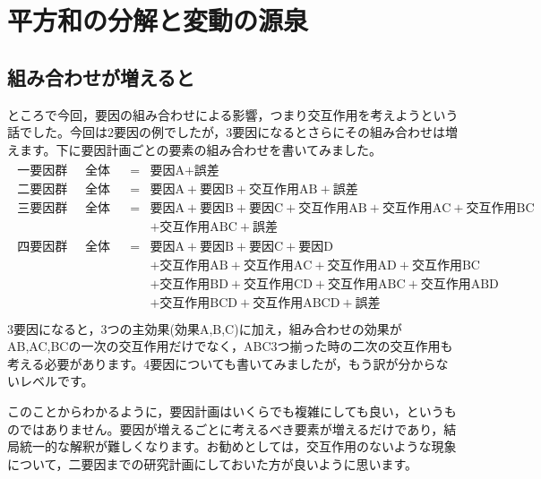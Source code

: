 \documentclass{ltjbook}
\begin{document}
\section{平方和の分解と変動の源泉}
\label{sec:18_3_source_of_variation}
\subsection{組み合わせが増えると}
ところで今回，要因の組み合わせによる影響，つまり交互作用を考えようという話でした。今回は2要因の例でしたが，3要因になるとさらにその組み合わせは増えます。下に要因計画ごとの要素の組み合わせを書いてみました。
\begin{align}
	\begin{array}{llll}
		\mbox{一要因群間計画} & \mbox{全体変動} & = & \mbox{要因A} + \mbox{誤差}                                                          \\
		\mbox{二要因群間計画} & \mbox{全体変動} & = & \mbox{要因A} + \mbox{要因B} +\mbox{交互作用AB} +\mbox{誤差}                               \\
		\mbox{三要因群間計画} & \mbox{全体変動} & = & \mbox{要因A} + \mbox{要因B} + \mbox{要因C}+\mbox{交互作用AB} +\mbox{交互作用AC}+\mbox{交互作用BC} \\
		               &             &   & +\mbox{交互作用ABC}  +\mbox{誤差}                                                     \\
		\mbox{四要因群間計画} & \mbox{全体変動} & = & \mbox{要因A} + \mbox{要因B} + \mbox{要因C} + \mbox{要因D}                               \\
		               &             &   & + \mbox{交互作用AB} +\mbox{交互作用AC} +\mbox{交互作用AD}+\mbox{交互作用BC}                     \\
		               &             &   & +\mbox{交互作用BD} +\mbox{交互作用CD}+\mbox{交互作用ABC}+\mbox{交互作用ABD}                     \\
		               &             &   & +\mbox{交互作用BCD} +\mbox{交互作用ABCD} +\mbox{誤差}                                     \\
	\end{array}
\end{align}
3要因になると，3つの主効果(効果A,B,C)に加え，組み合わせの効果がAB,AC,BCの一次の交互作用だけでなく，ABC3つ揃った時の二次の交互作用も考える必要があります。4要因についても書いてみましたが，もう訳が分からないレベルです。

このことからわかるように，要因計画はいくらでも複雑にしても良い，というものではありません。要因が増えるごとに考えるべき要素が増えるだけであり，結局統一的な解釈が難しくなります。お勧めとしては，交互作用のないような現象について，二要因までの研究計画にしておいた方が良いように思います。
\end{document}
